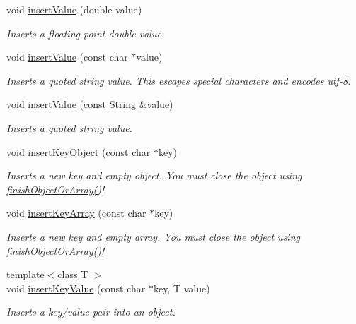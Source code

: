 \begin{DoxyCompactItemize}
void \hyperlink{class_json_writer_a5ccac7627d96f545498118340f7e5f75}{insert\+Value} (double value)
\begin{DoxyCompactList}\small\item\em Inserts a floating point double value. \end{DoxyCompactList}\item 
void \hyperlink{class_json_writer_aeac7ad2b336bb15c05a6094a59a42126}{insert\+Value} (const char $\ast$value)
\begin{DoxyCompactList}\small\item\em Inserts a quoted string value. This escapes special characters and encodes utf-\/8. \end{DoxyCompactList}\item 
void \hyperlink{class_json_writer_a6f8a280756ada908ab7e643f6dd1faa9}{insert\+Value} (const \hyperlink{class_string}{String} \&value)
\begin{DoxyCompactList}\small\item\em Inserts a quoted string value. \end{DoxyCompactList}\item 
void \hyperlink{class_json_writer_a338c3e07d0a6a2334da66684c8ae02a3}{insert\+Key\+Object} (const char $\ast$key)
\begin{DoxyCompactList}\small\item\em Inserts a new key and empty object. You must close the object using \hyperlink{class_json_writer_adbd96b46b0679bea3a066c0e62bd86b0}{finish\+Object\+Or\+Array()}! \end{DoxyCompactList}\item 
void \hyperlink{class_json_writer_ab051477eb92a5c565ea943b8d15e1779}{insert\+Key\+Array} (const char $\ast$key)
\begin{DoxyCompactList}\small\item\em Inserts a new key and empty array. You must close the object using \hyperlink{class_json_writer_adbd96b46b0679bea3a066c0e62bd86b0}{finish\+Object\+Or\+Array()}! \end{DoxyCompactList}\item 
{\footnotesize template$<$class T $>$ }\\void \hyperlink{class_json_writer_ac2de627389b59ce2c8ed95e10ea213bf}{insert\+Key\+Value} (const char $\ast$key, T value)
\begin{DoxyCompactList}\small\item\em Inserts a key/value pair into an object. \end{DoxyCompactList}\item 

\end{DoxyCompactItemize}

